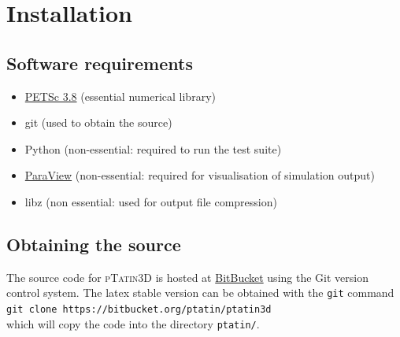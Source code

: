 \documentclass[paper=a4, fontsize=10pt,twoside]{scrartcl}
\newcommand{\ptat}{{{\textsc{pTatin3D}}}}
\newcommand{\shellcmd}[1]{\\\indent\indent\texttt{\hspace{5mm}\footnotesize #1}\\}
\newcommand{\unix}[1]{\texttt{\footnotesize #1}}
\begin{document}
\section{Installation}
\subsection{Software requirements}
\begin{itemize}
  \item \href{http://www.mcs.anl.gov/petsc}{PETSc 3.8} (essential numerical library)
	\item git (used to obtain the source)
	\item Python (non-essential: required to run the test suite)
	\item \href{www.paraview.org}{ParaView} (non-essential: required for visualisation of simulation output)
	\item libz (non essential: used for output file compression)
\end{itemize}

\subsection{Obtaining the source}
The source code for {\ptat} is hosted at \href{https://bitbucket.org}{BitBucket} using the Git version control system.
The latex stable version can be obtained with the \unix{git} command
\shellcmd{git clone https://bitbucket.org/ptatin/ptatin3d}
which will copy the code into the directory \unix{ptatin/}.
\end{document}
